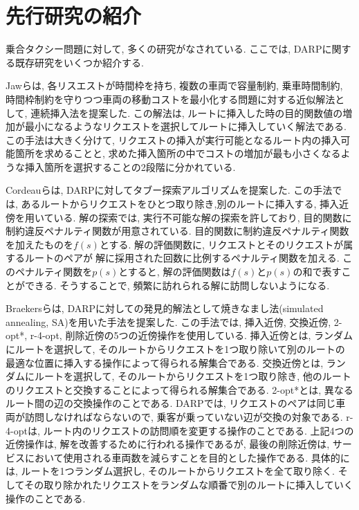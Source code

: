 \chapter{先行研究の紹介}\label{previous_research}
乗合タクシー問題に対して, 多くの研究がなされている. ここでは, DARPに関する既存研究をいくつか紹介する.

Jawらは, 各リスエストが時間枠を持ち, 複数の車両で容量制約, 乗車時間制約, 時間枠制約を守りつつ車両の移動コストを最小化する問題に対する近似解法として, 連続挿入法を提案した\cite{insertion}. この解法は, ルートに挿入した時の目的関数値の増加が最小になるようなリクエストを選択してルートに挿入していく解法である. この手法は大きく分けて, リクエストの挿入が実行可能となるルート内の挿入可能箇所を求めることと, 求めた挿入箇所の中でコストの増加が最も小さくなるような挿入箇所を選択することの2段階に分かれている.

Cordeauらは, DARPに対してタブー探索アルゴリズムを提案した\cite{tabu}. この手法では, あるルートからリクエストをひとつ取り除き,別のルートに挿入する, 挿入近傍を用いている. 解の探索では, 実行不可能な解の探索を許しており, 目的関数に制約違反ペナルティ関数が用意されている. 目的関数に制約違反ペナルティ関数を加えたものを$f(s)$とする. 解の評価関数に, リクエストとそのリクエストが属するルートのペアが解に採用された回数に比例するペナルティ関数を加える. このペナルティ関数を$p(s)$とすると, 解の評価関数は$f(s)とp(s)$の和で表すことができる. そうすることで, 頻繁に訪れられる解に訪問しないようになる.

Braekersらは, DARPに対しての発見的解法として焼きなまし法(simulated annealing, SA)を用いた手法を提案した\cite{SA}. この手法では, 挿入近傍, 交換近傍, 2-opt*, r-4-opt, 削除近傍の5つの近傍操作を使用している.
挿入近傍とは, ランダムにルートを選択して, そのルートからリクエストを1つ取り除いて別のルートの最適な位置に挿入する操作によって得られる解集合である.
交換近傍とは, ランダムにルートを選択して, そのルートからリクエストを1つ取り除き, 他のルートのリクエストと交換することによって得られる解集合である.
2-opt*とは, 異なるルート間の辺の交換操作のことである.  DARPでは, リクエストのペアは同じ車両が訪問しなければならないので, 乗客が乗っていない辺が交換の対象である.
r-4-optは, ルート内のリクエストの訪問順を変更する操作のことである.
上記4つの近傍操作は, 解を改善するために行われる操作であるが, 最後の削除近傍は, サービスにおいて使用される車両数を減らすことを目的とした操作である. 具体的には, ルートを1つランダム選択し, そのルートからリクエストを全て取り除く. そしてその取り除かれたリクエストをランダムな順番で別のルートに挿入していく操作のことである.

